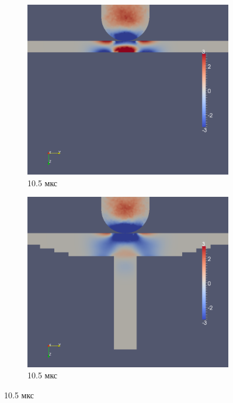 \begin{figure}[htp]
\begin{subfigure}[b]{0.5\textwidth}
\centering
\includegraphics[width=\textwidth]{png/pkm-experiment/wing-only/wave/syy-0009.png}
\caption{10.5 мкс}
\end{subfigure}
\begin{subfigure}[b]{0.5\textwidth}
\centering
\includegraphics[width=\textwidth]{png/pkm-experiment/wing-stringer/wave/syy-0009.png}
\caption{10.5 мкс}
\end{subfigure}

\end{figure}
